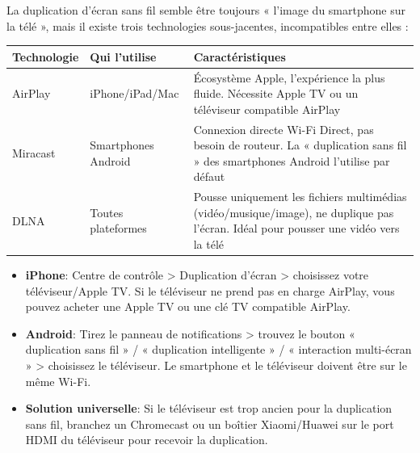 


La duplication d'écran sans fil semble être toujours « l'image du smartphone sur la télé », mais il existe trois technologies sous-jacentes, incompatibles entre elles :

\begin{center}
\begin{tabularx}{\linewidth}{|X|X|X|}
\hline
\textbf{Technologie} & \textbf{Qui l'utilise} & \textbf{Caractéristiques} \tabularnewline
\hline
AirPlay & iPhone/iPad/Mac & Écosystème Apple, l'expérience la plus fluide. Nécessite Apple TV ou un téléviseur compatible AirPlay \tabularnewline
Miracast & Smartphones Android & Connexion directe Wi-Fi Direct, pas besoin de routeur. La « duplication sans fil » des smartphones Android l'utilise par défaut \tabularnewline
DLNA & Toutes plateformes & Pousse uniquement les fichiers multimédias (vidéo/musique/image), ne duplique pas l'écran. Idéal pour pousser une vidéo vers la télé \tabularnewline
\hline
\end{tabularx}
\end{center}


\begin{itemize}
  \item \textbf{iPhone}: Centre de contrôle > Duplication d'écran > choisissez votre téléviseur/Apple TV. Si le téléviseur ne prend pas en charge AirPlay, vous pouvez acheter une Apple TV ou une clé TV compatible AirPlay.
  \item \textbf{Android}: Tirez le panneau de notifications > trouvez le bouton « duplication sans fil » / « duplication intelligente » / « interaction multi-écran » > choisissez le téléviseur. Le smartphone et le téléviseur doivent être sur le même Wi-Fi.
  \item \textbf{Solution universelle}: Si le téléviseur est trop ancien pour la duplication sans fil, branchez un Chromecast ou un boîtier Xiaomi/Huawei sur le port HDMI du téléviseur pour recevoir la duplication.
\end{itemize}


